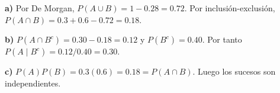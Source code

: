 \textbf{a)} Por De Morgan, $P(A\cup B)=1-0.28=0.72$.
Por inclusión-exclusión,
$P(A\cap B)=0.3+0.6-0.72=\boxed{0.18}$.

\textbf{b)} $P(A\cap B^c)=0.30-0.18=0.12$ y $P(B^c)=0.40$.
Por tanto $P(A\mid B^c)=0.12/0.40=\boxed{0.30}$.

\textbf{c)} $P(A)P(B)=0.3(0.6)=0.18=P(A\cap B)$.
Luego los sucesos son independientes.
